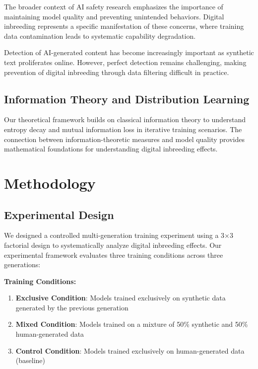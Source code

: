 \documentclass{article}
\begin{document}
The broader context of AI safety research \cite{amodei2016concrete, russell2019human} emphasizes the importance of maintaining model quality and preventing unintended behaviors. Digital inbreeding represents a specific manifestation of these concerns, where training data contamination leads to systematic capability degradation.

Detection of AI-generated content has become increasingly important \cite{mitchell2023detectgpt, kirchenbauer2023watermark} as synthetic text proliferates online. However, perfect detection remains challenging, making prevention of digital inbreeding through data filtering difficult in practice.

\subsection{Information Theory and Distribution Learning}

Our theoretical framework builds on classical information theory \cite{shannon1948mathematical, cover1999elements} to understand entropy decay and mutual information loss in iterative training scenarios. The connection between information-theoretic measures and model quality provides mathematical foundations for understanding digital inbreeding effects.

\section{Methodology}

\subsection{Experimental Design}

We designed a controlled multi-generation training experiment using a 3×3 factorial design to systematically analyze digital inbreeding effects. Our experimental framework evaluates three training conditions across three generations:

\textbf{Training Conditions:}
\begin{enumerate}
    \item \textbf{Exclusive Condition}: Models trained exclusively on synthetic data generated by the previous generation
    \item \textbf{Mixed Condition}: Models trained on a mixture of 50\% synthetic and 50\% human-generated data
    \item \textbf{Control Condition}: Models trained exclusively on human-generated data (baseline)
\end{enumerate}
\end{document}
